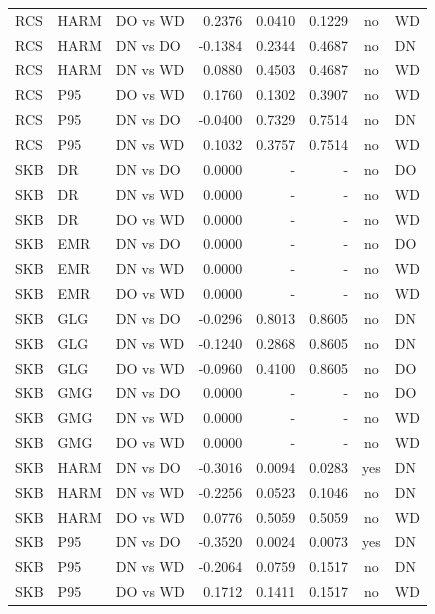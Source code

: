 \begin{center}
\begin{longtable}{p{1.0cm}p{1.0cm}p{1.8cm}r r r c p{1.0cm}}
RCS & HARM & DO vs WD & 0.2376 & 0.0410 & 0.1229 & no & WD \\
RCS & HARM & DN vs DO & -0.1384 & 0.2344 & 0.4687 & no & DN \\
RCS & HARM & DN vs WD & 0.0880 & 0.4503 & 0.4687 & no & WD \\
RCS & P95 & DO vs WD & 0.1760 & 0.1302 & 0.3907 & no & WD \\
RCS & P95 & DN vs DO & -0.0400 & 0.7329 & 0.7514 & no & DN \\
RCS & P95 & DN vs WD & 0.1032 & 0.3757 & 0.7514 & no & WD \\
SKB & DR & DN vs DO & 0.0000 & - & - & no & DO \\
SKB & DR & DN vs WD & 0.0000 & - & - & no & WD \\
SKB & DR & DO vs WD & 0.0000 & - & - & no & WD \\
SKB & EMR & DN vs DO & 0.0000 & - & - & no & DO \\
SKB & EMR & DN vs WD & 0.0000 & - & - & no & WD \\
SKB & EMR & DO vs WD & 0.0000 & - & - & no & WD \\
SKB & GLG & DN vs DO & -0.0296 & 0.8013 & 0.8605 & no & DN \\
SKB & GLG & DN vs WD & -0.1240 & 0.2868 & 0.8605 & no & DN \\
SKB & GLG & DO vs WD & -0.0960 & 0.4100 & 0.8605 & no & DO \\
SKB & GMG & DN vs DO & 0.0000 & - & - & no & DO \\
SKB & GMG & DN vs WD & 0.0000 & - & - & no & WD \\
SKB & GMG & DO vs WD & 0.0000 & - & - & no & WD \\
SKB & HARM & DN vs DO & -0.3016 & 0.0094 & 0.0283 & yes & DN \\
SKB & HARM & DN vs WD & -0.2256 & 0.0523 & 0.1046 & no & DN \\
SKB & HARM & DO vs WD & 0.0776 & 0.5059 & 0.5059 & no & WD \\
SKB & P95 & DN vs DO & -0.3520 & 0.0024 & 0.0073 & yes & DN \\
SKB & P95 & DN vs WD & -0.2064 & 0.0759 & 0.1517 & no & DN \\
SKB & P95 & DO vs WD & 0.1712 & 0.1411 & 0.1517 & no & WD \\
\hline
\end{longtable}
\normalsize
\end{center}
